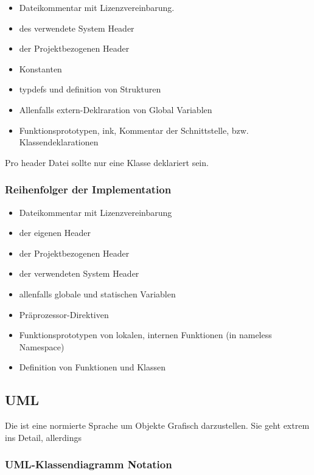 \begin{itemize}[itemsep=1pt, parsep=0pt]
    \item Dateikommentar mit Lizenzvereinbarung.
    \item {} des verwendete System Header
    \item {} der Projektbezogenen Header
    \item Konstanten
    \item typdefs und definition von Strukturen
    \item Allenfalls extern-Deklraration von Global Variablen
    \item Funktionsprototypen, ink, Kommentar der Schnittstelle, bzw. Klassendeklarationen
\end{itemize}

Pro header Datei sollte nur eine Klasse deklariert sein.

\subsubsection{Reihenfolger der Implementation}

\begin{itemize}[itemsep=1pt, parsep=0pt]
    \item Dateikommentar mit Lizenzvereinbarung
    \item {} der eigenen Header
    \item {} der Projektbezogenen Header
    \item {} der verwendeten System Header
    \item allenfalls globale und statischen Variablen
    \item Präprozessor-Direktiven
    \item Funktionsprototypen von lokalen, internen Funktionen (in nameless Namespace)
    \item Definition von Funktionen und Klassen
\end{itemize}

\subsection{UML}

Die  ist eine normierte Sprache um Objekte Grafisch darzustellen. 
Sie geht extrem ins Detail, allerdings 

\subsubsection{UML-Klassendiagramm Notation}

